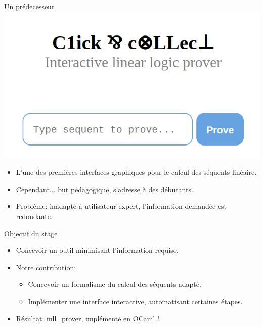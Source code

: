 \documentclass{beamer}
\begin{document}
\begin{frame}{Un prédecesseur}
    \centering
    \includegraphics[scale=0.35]{images/C&C_home.png}

    \pause
    
    \begin{itemize}
        \item L'une des premières interfaces graphiques pour le calcul des séquents linéaire.
            \pause
        \item Cependant... but pédagogique, s'adresse à des débutants.
            \pause
        \item Problème: inadapté à utilisateur expert, l'information demandée est redondante.
    \end{itemize}


\end{frame}

\begin{frame}{Objectif du stage}
    \begin{itemize}
        \item Concevoir un outil minimisant l'information requise.
        \item Notre contribution:
            \begin{itemize}
                \item Concevoir un formalisme du calcul des séquents adapté.
                
                \item Implémenter une interface interactive, automatisant certaines étapes.
            \end{itemize}
            \pause
        \item Résultat: mll\_prover, implémenté en OCaml !
    \end{itemize}
\end{frame}
\end{document}
